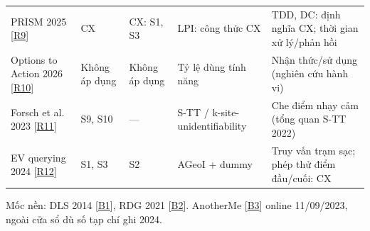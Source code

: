 \begin{longtable}{@{}P{3.044cm}P{1.474cm}P{2.093cm}P{4.138cm}P{5.327cm}@{}}
\addlinespace[3pt]
PRISM 2025 [\href{https://www.sciencedirect.com/science/article/pii/S1084804525001687}{R9}] & CX & CX: S1, S3 & LPI: công thức CX & TDD, DC: định nghĩa CX; thời gian xử lý/phản hồi\\
\addlinespace[3pt]
Options to Action 2026 [\href{https://elathan.github.io/papers/chi26.pdf}{R10}] & Không áp dụng & Không áp dụng & Tỷ lệ dùng tính năng & Nhận thức/sử dụng (nghiên cứu hành vi)\\
\addlinespace[3pt]
Forsch et al. 2023 [\href{https://link.springer.com/chapter/10.1007/978-3-031-35374-1_3}{R11}] & S9, S10 & — & S-TT / k-site-unidentifiability & Che điểm nhạy cảm (tổng quan S-TT 2022)\\
\addlinespace[3pt]
EV querying 2024 [\href{https://wrap.warwick.ac.uk/id/eprint/183198/1/WRAP-privacy-preserving-querying-mechanism-high-utility-electric-vehicles-2024.pdf}{R12}] & S1, S3 & S2 & AGeoI + dummy & Truy vấn trạm sạc; phép thử điểm đầu/cuối: CX\\
\end{longtable}
\endgroup
Mốc nền: DLS 2014 [\href{https://doi.org/10.1109/INFOCOM.2014.6848002}{B1}], RDG 2021 [\href{https://doi.org/10.1109/TMC.2020.2993599}{B2}]. AnotherMe [\href{https://ieeexplore.ieee.org/document/10246991/}{B3}] online 11/09/2023, ngoài cửa sổ dù số tạp chí ghi 2024.

